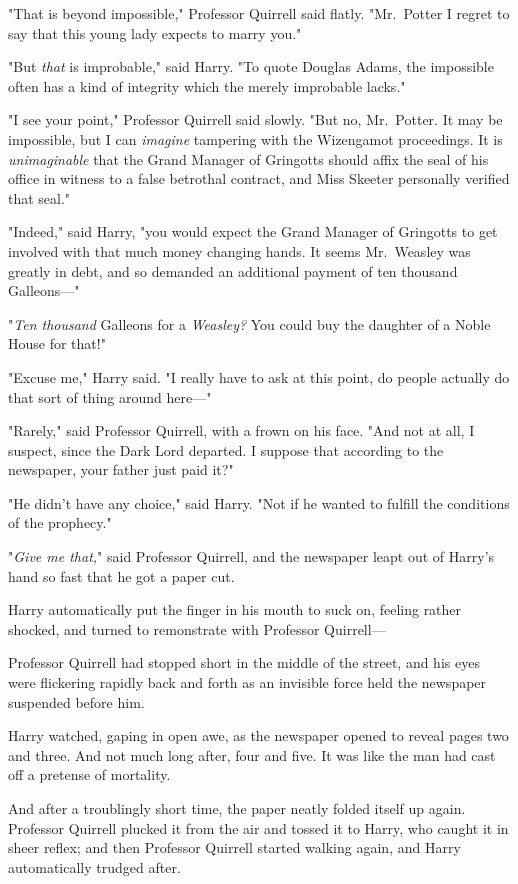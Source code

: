 "That is beyond impossible," Professor Quirrell said flatly.
"Mr.~Potter{\el} I regret to say that this young lady expects to marry you."

"But \emph{that} is improbable," said Harry. "To quote Douglas Adams, the
impossible often has a kind of integrity which the merely improbable lacks."

"I see your point," Professor Quirrell said slowly. "But{\el} no,
Mr.~Potter. It may be impossible, but I can \emph{imagine} tampering with the
Wizengamot proceedings. It is \emph{unimaginable} that the Grand Manager of
Gringotts should affix the seal of his office in witness to a false betrothal
contract, and Miss Skeeter personally verified that seal."

"Indeed," said Harry, "you would expect the Grand Manager of Gringotts to get
involved with that much money changing hands. It seems Mr.~Weasley was greatly
in debt, and so demanded an additional payment of ten thousand Galleons\mbox{---}"

"\emph{Ten thousand} Galleons for a \emph{Weasley?} You could buy the daughter
of a Noble House for that!"

"Excuse me," Harry said. "I really have to ask at this point, do people
actually do that sort of thing around here\mbox{---}"

"Rarely," said Professor Quirrell, with a frown on his face. "And not at all, I
suspect, since the Dark Lord departed. I suppose that according to the
newspaper, your father just paid it?"

"He didn't have any choice," said Harry. "Not if he wanted to fulfill the
conditions of the prophecy."

"\emph{Give me that,}" said Professor Quirrell, and the newspaper leapt out of
Harry's hand so fast that he got a paper cut.

Harry automatically put the finger in his mouth to suck on, feeling rather
shocked, and turned to remonstrate with Professor Quirrell---

Professor Quirrell had stopped short in the middle of the street, and his eyes
were flickering rapidly back and forth as an invisible force held the newspaper
suspended before him.

Harry watched, gaping in open awe, as the newspaper opened to reveal pages two
and three. And not much long after, four and five. It was like the man had cast
off a pretense of mortality.

And after a troublingly short time, the paper neatly folded itself up again.
Professor Quirrell plucked it from the air and tossed it to Harry, who caught
it in sheer reflex; and then Professor Quirrell started walking again, and
Harry automatically trudged after.

